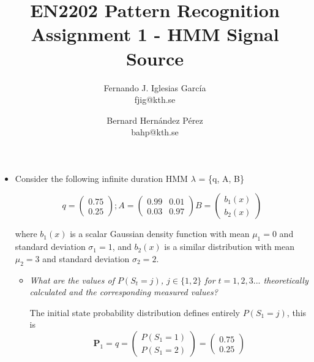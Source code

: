 \documentclass[a4paper]{article}
\begin{document}
\title{EN2202 Pattern Recognition\\
Assignment 1 - HMM Signal Source}
\author{Fernando J. Iglesias Garc\'{i}a \\ fjig@kth.se
	\and
	Bernard Hern\'{a}ndez P\'{e}rez \\ bahp@kth.se }

\maketitle

\begin{itemize}
\item Consider the following infinite duration HMM $\lambda$ = \{q, A, B\}

\begin{equation}
	\label{eq:def_hmm1}
	q = \begin{pmatrix} 0.75 \\ 0.25 \end{pmatrix};
	A = \begin{pmatrix} 0.99 & 0.01 \\ 0.03 & 0.97 \end{pmatrix}
	B = \begin{pmatrix} b_1(x) \\ b_2(x) \end{pmatrix}
\end{equation}

\noindent
where $b_1(x)$ is a scalar Gaussian density function with mean
$\mu_1=0$ and standard deviation $\sigma_1=1$, and $b_2(x)$ is a similar
distribution with mean $\mu_2=3$ and standard deviation $\sigma_2=2$.

\begin{itemize}

	\item \emph{What are the values of $P(S_t=j)$, $j \in \{1,2\}$ for
		$t = 1,2,3...$ \linebreak theoretically calculated and the corresponding
		measured values?}

	The initial state probability distribution defines entirely $P(S_1=j)$,
	this is
	~
	\begin{equation*}
		\mathbf{P}_1 = q = \begin{pmatrix} P(S_1=1) \\ P(S_1=2) \end{pmatrix} =
				\begin{pmatrix} 0.75 \\ 0.25 \end{pmatrix}
	\end{equation*}


\end{itemize}
\end{itemize}
\end{document}
